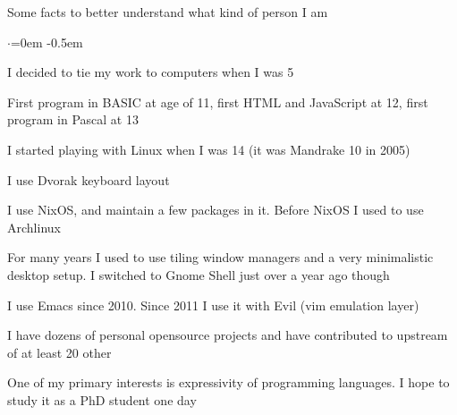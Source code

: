 \documentclass{resume} %
\begin{document}
\begin{rSection}{Some facts to better understand what kind of person I am}
  \smallskip
  \begin{list}{$\cdot$}{\leftmargin=0em} %
    \itemsep -0.5em \vspace{-0.5em} %
  \item I decided to tie my work to computers when I was 5
  \item First program in BASIC at age of 11, first HTML and JavaScript at 12, first program in Pascal at 13
  \item I started playing with Linux when I was 14 (it was Mandrake 10 in 2005)
  \item I use Dvorak keyboard layout
  \item I use NixOS, and maintain a few packages in it. Before NixOS I used to use Archlinux
  \item For many years I used to use tiling window managers and a very minimalistic desktop setup. I switched to Gnome Shell just over a year ago though
  \item I use Emacs since 2010. Since 2011 I use it with Evil (vim emulation layer)
  \item I have dozens of personal opensource projects and have contributed to
        upstream of at least 20 other
  \item One of my primary interests is expressivity of programming languages. I hope to study it as a PhD student one day
  \end{list}
\end{rSection}
\end{document}
